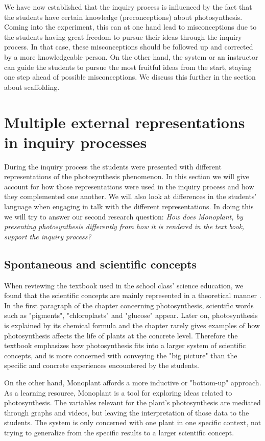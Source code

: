 We have now established that the inquiry process is influenced by the fact that the students have certain knowledge (preconceptions) about photosynthesis. Coming into the experiment, this can at one hand lead to misconceptions due to the students having great freedom to pursue their ideas through the inquiry process. In that case, these misconceptions should be followed up and corrected by a more knowledgeable person. On the other hand, the system or an instructor can guide the students to pursue the most fruitful ideas from the start, staying one step ahead of possible misconceptions. We discuss this further in the section about scaffolding.



\section{Multiple external representations in inquiry processes}
During the inquiry process the students were presented with different representations of the photosynthesis phenomenon. In this section we will give account for how those representations were used in the inquiry process and how they complemented one another. We will also look at differences in the students' language when engaging in talk with the different representations. In doing this we will try to answer our second research question: \emph{How does Monoplant, by presenting photosynthesis differently from how it is rendered in the text book, support the inquiry process?}

\subsection{Spontaneous and scientific concepts}
When reviewing the textbook used in the school class' science education, we found that the scientific concepts are mainly represented in a theoretical manner \citep{bios}. In the first paragraph of the chapter concerning photosynthesis, scientific words such as "pigments", "chloroplasts" and "glucose" appear. Later on, photosynthesis is explained by its chemical formula and the chapter rarely gives examples of how photosynthesis affects the life of plants at the concrete level. Therefore the textbook emphasizes how photosynthesis fits into a larger system of scientific concepts, and is more concerned with conveying the "big picture" than the specific and concrete experiences encountered by the students. 

On the other hand, Monoplant affords a more inductive or "bottom-up" approach. As a learning resource, Monoplant is a tool for exploring ideas related to photosynthesis. The variables relevant for the plant's photosynthesis are mediated through graphs and videos, but leaving the interpretation of those data to the students. The system is only concerned with one plant in one specific context, not trying to generalize from the specific results to a larger scientific concept. 

